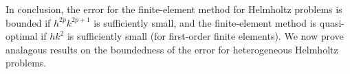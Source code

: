 In conclusion, the error for the finite-element method for Helmholtz problems is bounded if $h^{2p}k^{2p+1}$ is sufficiently small, and the finite-element method is quasi-optimal if $hk^2$ is sufficiently small (for first-order finite elements). We  now prove analagous results on the boundedness of the error for heterogeneous Helmholtz problems.






